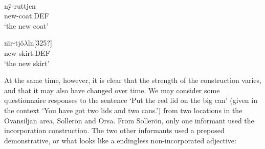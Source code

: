 
\ea
	\\

	\z 
\z 

\ea\label{}
\gll n\={y}-ruttjen\\
new-coat.DEF\\
\glt ‘the new coat’
\z

\ea\label{}
\gll n{\=\i}r-tj\u{o}$\lambda $ln[325?]\\
new-skirt.DEF\\
\glt ‘the new skirt’
\z

At the same time, however, it is clear that the strength of the construction varies, and that it may also have changed over time. We may consider some questionnaire responses to the sentence ‘Put the red lid on the big can’ (given in the context ‘You have got two lids and two cans.’) from two locations in the Ovansiljan area, Sollerön and Orsa. From Sollerön, only one informant used the incorporation construction. The two other informants used a preposed demonstrative, or what looks like a endingless non-incorporated adjective: 


\ea\label{}


\z
\z

